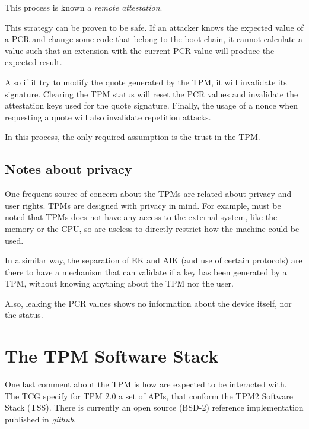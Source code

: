 \documentclass{article}
\begin{document}
This process is known a \emph{remote attestation}.

This strategy can be proven to be safe. If an attacker knows the
expected value of a PCR and change some code that belong to the boot
chain, it cannot calculate a value such that an extension with the
current PCR value will produce the expected result.

Also if it try to modify the quote generated by the TPM, it will
invalidate its signature.  Clearing the TPM status will reset the PCR
values and invalidate the attestation keys used for the quote
signature.  Finally, the usage of a nonce when requesting a quote will
also invalidate repetition attacks.

In this process, the only required assumption is the trust in the TPM.

\subsection{Notes about privacy}
One frequent source of concern about the TPMs are related about
privacy and user rights.  TPMs are designed with privacy in mind.  For
example, must be noted that TPMs does not have any access to the
external system, like the memory or the CPU, so are useless to
directly restrict how the machine could be used.

In a similar way, the separation of EK and AIK (and use of certain
protocols) are there to have a mechanism that can validate if a key
has been generated by a TPM, without knowing anything about the TPM
nor the user.

Also, leaking the PCR values shows no information about the device
itself, nor the status.

\section{The TPM Software Stack}
One last comment about the TPM is how are expected to be interacted
with.  The TCG specify for TPM 2.0 a set of APIs, that conform the
TPM2 Software Stack (TSS).  There is currently an open source (BSD-2)
reference implementation published in \emph{github}\cite{tss}.
\end{document}
